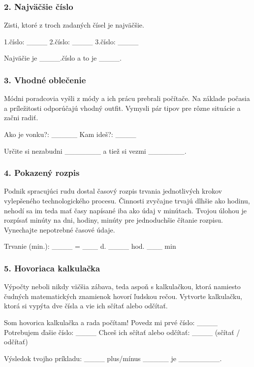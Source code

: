 \subsubsection*{2. Najväčšie číslo}
Zisti, ktoré z troch zadaných čísel je najväčšie.

\begin{code}
1.číslo: ____
2.číslo: ____
3.číslo: ____

Najväčie je ____.číslo a to je ____.
\end{code}


\subsubsection*{3. Vhodné oblečenie}
Módni poradcovia vyšli z módy a ich prácu prebrali počítače. Na základe počasia a príležitosti odporúčajú vhodný outfit. Vymysli pár tipov pre rôzne situácie a začni radiť.

\begin{code}
Ako je vonku?: _____
Kam ideš?: ____

Určite si nezabudni _______ a tiež si vezmi _______.
\end{code}


\subsubsection*{4. Pokazený rozpis}
Podnik spracujúci rudu dostal časový rozpis trvania jednotlivých krokov vylepšeného technologického procesu. Činnosti zvyčajne trvajú dlhšie ako hodinu, nehodí sa im teda mať časy napísané iba ako údaj v minútach. Tvojou úlohou je rozpísať minúty na dni, hodiny, minúty pre jednoduchšie čítanie rozpisu. Vynechajte nepotrebné časové údaje.

\begin{code}
Trvanie (min.): ____
= ___ d. ____ hod. ___ min
\end{code}


\subsubsection*{5. Hovoriaca kalkulačka}
Výpočty neboli nikdy väčšia zábava, teda aspoň s kalkulačkou, ktorá namiesto čudných matematických znamienok hovorí ľudskou rečou. Vytvorte kalkulačku, ktorá si vypýta dve čísla a vie ich sčítať alebo odčítať.

\begin{code}
Som hovorica kalkulačka a rada počítam!
Povedz mi prvé číslo: ____
Potrebujem ďašie číslo: ____
Chceš ich sčítať alebo odčítať: ____ (sčítať / odčítať)

Výsledok tvojho príkladu: ____ plus/mínus _____ je ________.
\end{code}

